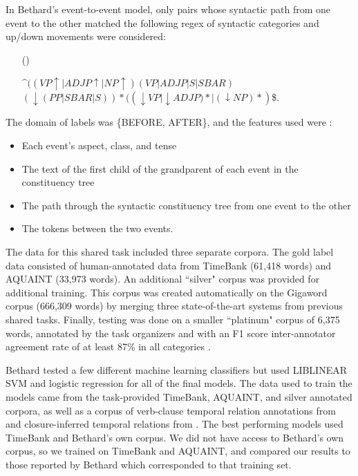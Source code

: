 \documentclass[11pt]{article}
\begin{document}
In Bethard's event-to-event model, only pairs whose syntactic path from one event to the other matched the following regex of syntactic categories and up/down movements were considered:

\begin{itemize}[labelindent=2em, labelsep*=2em, leftmargin=!]

\item[(\exampleno)] \label{syntax_regex}

\^{}$((VP\uparrow|ADJP\uparrow|NP\uparrow)(VP|ADJP|S|SBAR)$\\ $(\downarrow(PP|SBAR|S))*(({\downarrow}VP|{\downarrow}ADJP)*|({\downarrow}NP)*)$\$.
\end{itemize}


The domain of labels was \{BEFORE, AFTER\}, and the features used were \cite{Bethard:13}:

\begin{itemize}
\item Each event's aspect, class, and tense
\item The text of the first child of the grandparent of each event in the constituency tree
\item The path through the syntactic constituency tree from one event to the other
\item The tokens between the two events.
\end{itemize}

%
The data for this shared task included three separate corpora. The gold label data consisted of human-annotated data from TimeBank (61,418 words) and AQUAINT (33,973 words). An additional ``silver" corpus was provided for additional training. This corpus was created automatically on the Gigaword corpus (666,309 words) by merging three state-of-the-art systems from previous shared tasks. Finally, testing was done on a smaller ``platinum" corpus of 6,375 words, annotated by the task organizers and with an F1 score inter-annotator agreement rate of at least 87\% in all categories \cite{UzZaman:13}.

Bethard tested a few different machine learning classifiers but used LIBLINEAR SVM and logistic regression for all of the final models. The data used to train the models came from the task-provided TimeBank, AQUAINT, and silver annotated corpora, as well as a corpus of verb-clause temporal relation annotations from  and closure-inferred temporal relations from . The best performing models used TimeBank and Bethard's own corpus. We did not have access to Bethard's own corpus, so we trained on TimeBank and AQUAINT, and compared our results to those reported by Bethard which corresponded to that training set.
\end{document}
